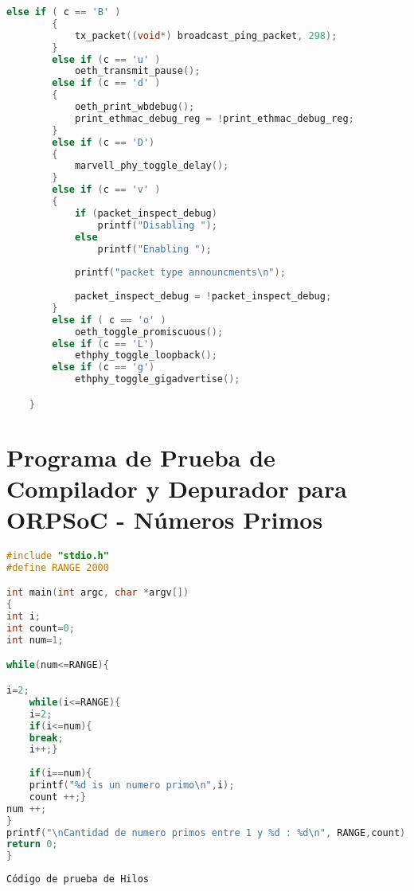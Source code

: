 \begin{lstlisting}[language=C,frame=single]
		else if ( c == 'B' )
		{
			tx_packet((void*) broadcast_ping_packet, 298);
		}
		else if (c == 'u' )
			oeth_transmit_pause();
		else if (c == 'd' )
		{
			oeth_print_wbdebug();
			print_ethmac_debug_reg = !print_ethmac_debug_reg;
		}
		else if (c == 'D')
		{
			marvell_phy_toggle_delay();
		}
		else if (c == 'v' )
		{
			if (packet_inspect_debug)
				printf("Disabling ");
			else 
				printf("Enabling ");
			
			printf("packet type announcments\n");
			
			packet_inspect_debug = !packet_inspect_debug;
		}
		else if ( c == 'o' )
			oeth_toggle_promiscuous();
		else if (c == 'L')
			ethphy_toggle_loopback();
		else if (c == 'g')
			ethphy_toggle_gigadvertise();

	}
	 \end{lstlisting}
	 
	  \section{Programa de Prueba de Compilador y Depurador para ORPSoC - Números Primos}

\begin{lstlisting}[language=C,frame=single]
#include "stdio.h"
#define RANGE 2000

int main(int argc, char *argv[])
{
int i;
int count=0;
int num=1;

while(num<=RANGE){

i=2;
	while(i<=RANGE){
	i=2;
	if(i<=num){
	break;
	i++;}
	
	if(i==num){
	printf("%d is un numero primo\n",i);
	count ++;}
num ++;
}
printf("\nCantidad de numero primos entre 1 y %d : %d\n", RANGE,count);
return 0;
}
 \end{lstlisting}


 \begin{lstlisting}[language=C,frame=single]
Código de prueba de Hilos 
	 \end{lstlisting}
	
	  




